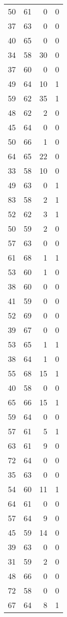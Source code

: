 \begin{tabular}{rrrr}
 50 &  61 &  0 &  0 \\
 37 &  63 &  0 &  0 \\
 40 &  65 &  0 &  0 \\
 34 &  58 & 30 &  0 \\
 37 &  60 &  0 &  0 \\
 49 &  64 & 10 &  1 \\
 59 &  62 & 35 &  1 \\
 48 &  62 &  2 &  0 \\
 45 &  64 &  0 &  0 \\
 50 &  66 &  1 &  0 \\
 64 &  65 & 22 &  0 \\
 33 &  58 & 10 &  0 \\
 49 &  63 &  0 &  1 \\
 83 &  58 &  2 &  1 \\
 52 &  62 &  3 &  1 \\
 50 &  59 &  2 &  0 \\
 57 &  63 &  0 &  0 \\
 61 &  68 &  1 &  1 \\
 53 &  60 &  1 &  0 \\
 38 &  60 &  0 &  0 \\
 41 &  59 &  0 &  0 \\
 52 &  69 &  0 &  0 \\
 39 &  67 &  0 &  0 \\
 53 &  65 &  1 &  1 \\
 38 &  64 &  1 &  0 \\
 55 &  68 & 15 &  1 \\
 40 &  58 &  0 &  0 \\
 65 &  66 & 15 &  1 \\
 59 &  64 &  0 &  0 \\
 57 &  61 &  5 &  1 \\
 63 &  61 &  9 &  0 \\
 72 &  64 &  0 &  0 \\
 35 &  63 &  0 &  0 \\
 54 &  60 & 11 &  1 \\
 64 &  61 &  0 &  0 \\
 57 &  64 &  9 &  0 \\
 45 &  59 & 14 &  0 \\
 39 &  63 &  0 &  0 \\
 31 &  59 &  2 &  0 \\
 48 &  66 &  0 &  0 \\
 72 &  58 &  0 &  0 \\
 67 &  64 &  8 &  1 \\

\end{tabular}
